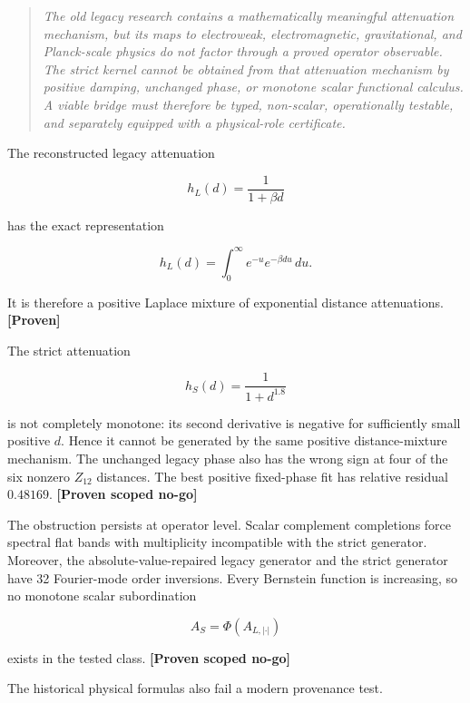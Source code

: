\documentclass[11pt,a4paper,openany]{report}
\newcommand{\statusProven}{\textcolor{fingreen}{[Proven]}}
\begin{document}
\begin{quote}\itshape
The old legacy research contains a mathematically meaningful attenuation mechanism, but its maps to electroweak, electromagnetic, gravitational, and Planck-scale physics do not factor through a proved operator observable. The strict kernel cannot be obtained from that attenuation mechanism by positive damping, unchanged phase, or monotone scalar functional calculus. A viable bridge must therefore be typed, non-scalar, operationally testable, and separately equipped with a physical-role certificate.

\end{quote}

The reconstructed legacy attenuation

\[
h_L(d)=\frac{1}{1+\beta d}
\]

has the exact representation

\[
h_L(d)
=
\int_0^\infty e^{-u}e^{-\beta d u}\,du.
\]

It is therefore a positive Laplace mixture of exponential distance attenuations. \textbf{\statusProven{}}

The strict attenuation

\[
h_S(d)=\frac{1}{1+d^{1.8}}
\]

is not completely monotone: its second derivative is negative for sufficiently small positive \(d\). Hence it cannot be generated by the same positive distance-mixture mechanism. The unchanged legacy phase also has the wrong sign at four of the six nonzero \(Z_{12}\) distances. The best positive fixed-phase fit has relative residual \(0.48169\). \textbf{[Proven scoped no-go]}

The obstruction persists at operator level. Scalar complement completions force spectral flat bands with multiplicity incompatible with the strict generator. Moreover, the absolute-value-repaired legacy generator and the strict generator have 32 Fourier-mode order inversions. Every Bernstein function is increasing, so no monotone scalar subordination

\[
A_S=\Phi(A_{L,\lvert\cdot\rvert})
\]

exists in the tested class. \textbf{[Proven scoped no-go]}

The historical physical formulas also fail a modern provenance test.
\end{document}

